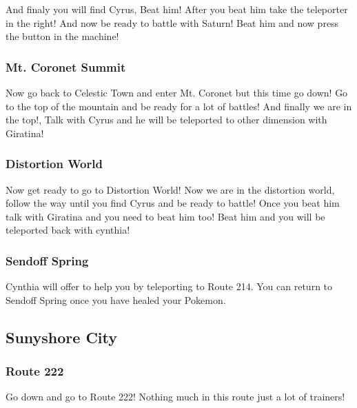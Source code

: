 \documentclass[11pt]{article}
\begin{document}
And finaly you will find Cyrus, Beat him!
After you beat him take the teleporter in the right!
And now be ready to battle with Saturn!
Beat him and now press the button in the machine!

\subsubsection{Mt. Coronet Summit}\label{subsubsec:back-to-mt.-coronet}
Now go back to Celestic Town and enter Mt. Coronet but this time go down!
Go to the top of the mountain and be ready for a lot of battles!
And finally we are in the top!, Talk with Cyrus and he will be
teleported to other dimension with Giratina!



\subsubsection{Distortion World}\label{subsubsec:distortion-world}
Now get ready to go to Distortion World!
Now we are in the distortion world, 
follow the way until you find Cyrus and be ready to battle!
Once you beat him talk with Giratina and you need to beat him too!
Beat him and you will be teleported back with cynthia!

\subsubsection{Sendoff Spring}\label{subsubsec:sendoff-spring}
Cynthia will offer to help you by teleporting to Route 214.
You can return to Sendoff Spring once you have healed your Pokemon.





\subsection{Sunyshore City}\label{subsec:sunyshore-city}

\subsubsection{Route 222}\label{subsubsec:route-222}
Go down and go to Route 222!
Nothing much in this route just a lot of trainers!




\end{document}
